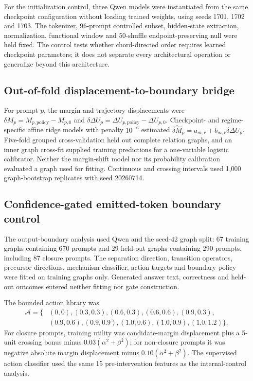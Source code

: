 \documentclass[11pt]{article}
\begin{document}
For the initialization control, three Qwen models were instantiated from the same checkpoint configuration without loading trained weights, using seeds 1701, 1702 and 1703. The tokenizer, 96-prompt controlled subset, hidden-state extraction, normalization, functional window and 50-shuffle endpoint-preserving null were held fixed. The control tests whether chord-directed order requires learned checkpoint parameters; it does not separate every architectural operation or generalize beyond this architecture.

\subsection*{Out-of-fold displacement-to-boundary bridge}
For prompt $p$, the margin and trajectory displacements were $\delta M_p=M_{p,\mathrm{policy}}-M_{p,0}$ and $\delta\Delta U_p=\Delta U_{p,\mathrm{policy}}-\Delta U_{p,0}$. Checkpoint- and regime-specific affine ridge models with penalty $10^{-6}$ estimated $\widehat{\delta M}_p=a_{m,r}+b_{m,r}\delta\Delta U_p$. Five-fold grouped cross-validation held out complete relation graphs, and an inner graph cross-fit supplied training predictions for a one-variable logistic calibrator. Neither the margin-shift model nor its probability calibration evaluated a graph used for fitting. Continuous and crossing intervals used 1,000 graph-bootstrap replicates with seed 20260714.

\subsection*{Confidence-gated emitted-token boundary control}
The output-boundary analysis used Qwen and the seed-42 graph split: 67 training graphs containing 670 prompts and 29 held-out graphs containing 290 prompts, including 87 closure prompts. The separation direction, transition operators, precursor directions, mechanism classifier, action targets and boundary policy were fitted on training graphs only. Generated answer text, correctness and held-out outcomes entered neither fitting nor gate construction.

The bounded action library was
\[
\begin{aligned}
\mathcal A=\{&(0,0),(0.3,0.3),(0.6,0.3),(0.6,0.6),(0.9,0.3),\\
&(0.9,0.6),(0.9,0.9),(1.0,0.6),(1.0,0.9),(1.0,1.2)\}.
\end{aligned}
\]
For closure prompts, training utility was candidate-margin displacement plus a 5-unit crossing bonus minus $0.03(\alpha^2+\beta^2)$; for non-closure prompts it was negative absolute margin displacement minus $0.10(\alpha^2+\beta^2)$. The supervised action classifier used the same 15 pre-intervention features as the internal-control analysis.
\end{document}
